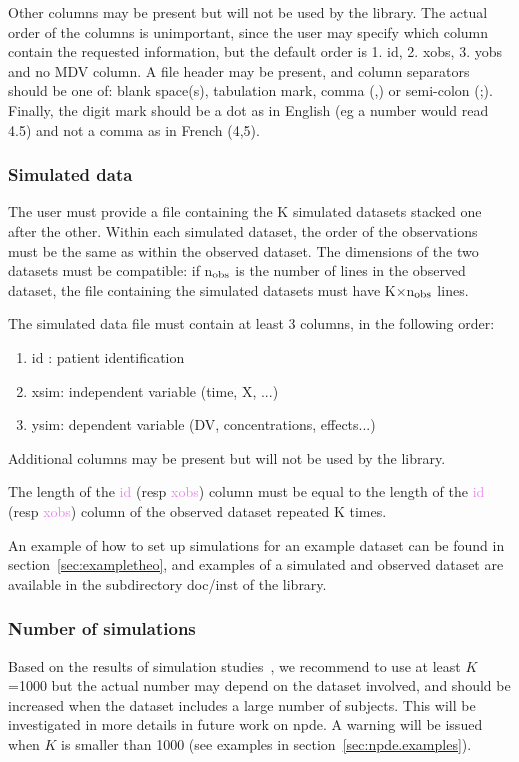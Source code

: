 Other columns may be present but will not be used by the library. The actual order of the columns is unimportant, since the user may specify which column contain the requested information, but the default order is 1. id, 2. xobs, 3. yobs and no MDV column. A file header may be present, and column separators should be one of: blank space(s), tabulation mark, comma (,) or semi-colon (;). Finally, the digit mark should be a dot as in English (eg a number would read 4.5) and not a comma as in French (4,5).

\subsubsection{Simulated data}

\hskip 18pt The user must provide a file containing the K simulated datasets stacked one after the other. Within each simulated dataset, the order of the observations must be the same as within the observed dataset. The dimensions of the two datasets must be compatible: if n$_{\rm obs}$ is the number of lines in the observed dataset, the file containing the simulated datasets must have K$\times$n$_{\rm obs}$ lines.

The simulated data file must contain at least 3 columns, in the following order:
\begin{enumerate}
\item id : patient identification
\item xsim: independent variable (time, X, ...)
\item ysim: dependent variable (DV, concentrations, effects...)
\end{enumerate}
Additional columns may be present but will not be used by the library.

The length of the \textcolor{violet}{id} (resp \textcolor{violet}{xobs}) column must be equal to the length of the \textcolor{violet}{id} (resp \textcolor{violet}{xobs}) column of the observed dataset repeated K times.

An example of how to set up simulations for an example dataset can be found in section~\ref{sec:exampletheo}, and examples of a simulated and observed dataset are available in the subdirectory {\sf doc/inst} of the library.

\subsubsection{Number of simulations}

\hskip 18pt Based on the results of simulation studies~\cite{Brendel10,Comets10}, we recommend to use at least $K$=1000 but the actual number may depend on the dataset involved, and should be increased when the dataset includes a large number of subjects. This will be investigated in more details in future work on {\sf npde}. A warning will be issued when $K$ is smaller than 1000 (see examples in section~\ref{sec:npde.examples}).

